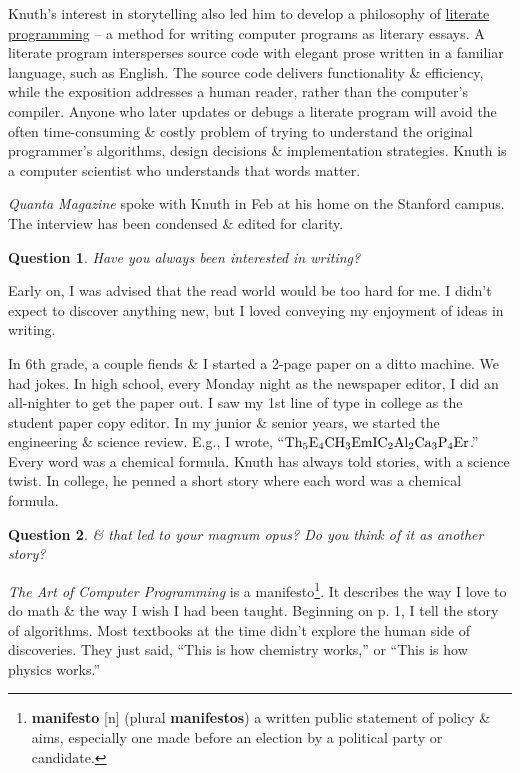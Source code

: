 \documentclass[oneside]{book}
\numberwithin{equation}{section}
\newtheorem{question}{Question}[chapter]
\begin{document}
Knuth's interest in storytelling also led him to develop a philosophy of \href{https://www-cs-faculty.stanford.edu/~knuth/lp.html}{literate programming} -- a method for writing computer programs as literary essays. A literate program intersperses source code with elegant prose written in a familiar language, such as English. The source code delivers functionality \& efficiency, while the exposition addresses a human reader, rather than the computer's compiler. Anyone who later updates or debugs a literate program will avoid the often time-consuming \& costly problem of trying to understand the original programmer's algorithms, design decisions \& implementation strategies. Knuth is a computer scientist who understands that words matter.

\textit{Quanta Magazine} spoke with Knuth in Feb at his home on the Stanford campus. The interview has been condensed \& edited for clarity.

\begin{question}
	Have you always been interested in writing?
\end{question}
Early on, I was advised that the read world would be too hard for me. I didn't expect to discover anything new, but I loved conveying my enjoyment of ideas in writing.

In 6th grade, a couple fiends \& I started a 2-page paper on a ditto machine. We had jokes. In high school, every Monday night as the newspaper editor, I did an all-nighter to get the paper out. I saw my 1st line of type in college as the student paper copy editor. In my junior \& senior years, we started the engineering \& science review. E.g., I wrote, ``$\rm Th_5E_4 CH_3EmIC_2Al_2 Ca_3P_4Er$.'' Every word was a chemical formula. \textsf{Knuth has always told stories, with a science twist. In college, he penned a short story where each word was a chemical formula.}

\begin{question}
	\& that led to your magnum opus? Do you think of it as another story?
\end{question}
\textit{The Art of Computer Programming} is a manifesto\footnote{\textbf{manifesto} [n] (plural \textbf{manifestos}) a written public statement of policy \& aims, especially one made before an election by a political party or candidate.}. It describes the way I love to do math \& the way I wish I had been taught. Beginning on p. 1, I tell the story of algorithms. Most textbooks at the time didn't explore the human side of discoveries. They just said, ``This is how chemistry works,'' or ``This is how physics works.''
\end{document}
